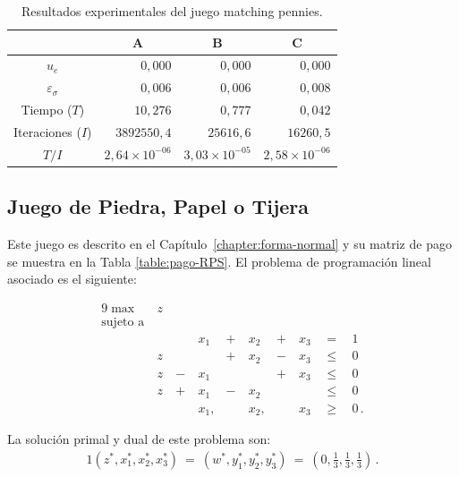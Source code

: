 \begin{table}[h]
\caption{Resultados experimentales del juego matching pennies.}
\label{table:resultados-rm-matching-pennies}
\centering
\begin{tabular}{c r r r}
    \toprule
    & \multicolumn{1}{c}{A} & \multicolumn{1}{c}{B} & \multicolumn{1}{c}{C} \\ \midrule
    $u_e$ & $0,000$ & $0,000$ & $0,000$ \\
    $\varepsilon_{\sigma}$ & $0,006$ & $0,006$ & $0,008$ \\
    Tiempo ($T$) & $10,276$ & $0,777$ & $0,042$ \\
    Iteraciones ($I$) & $3892550,4$ & $25616,6$ & $16260,5$ \\
    $T/I$ & $2,64 {\times} 10^{-06}$ & $3,03 {\times} 10^{-05}$ & $2,58 {\times} 10^{-06}$ \\
    \bottomrule
\end{tabular}
\end{table}


\subsection*{Juego de Piedra, Papel o Tijera}

Este juego es descrito en el Capítulo~\ref{chapter:forma-normal} y su matriz de pago se muestra en la Tabla \ref{table:pago-RPS}. El problema de programación lineal asociado es el siguiente:
\begin{samepage}
\begin{alignat}{9}
\max\  & z\ &  & & & & & \\ \nonumber
\text{sujeto a}\ & & & & & & & \\  \nonumber 
&    &    & x_1\ & +\ & x_2\ & +\ & x_3\ & \ =\     & \ 1 \\ \nonumber
& z\ &    &      & +\ & x_2\ & -\ & x_3\ & \ \leq\  & \ 0 \\ \nonumber
& z\ & -\ & x_1\ &    &      & +\ & x_3\ & \ \leq\  & \ 0 \\ \nonumber
& z\ & +\ & x_1\ & -\ & x_2\ &    &      & \ \leq\  & \ 0 \\ \nonumber
&    &    & x_1, &    & x_2, &    & x_3\ & \ \geq\  & \ 0  \,.  \nonumber
\end{alignat}
\end{samepage}
La solución primal y dual de este problema son:
\begin{alignat}{1}
(z^*, x_1^*, x_2^*, x_3^*)\ =\ (w^*, y_1^*, y_2^*, y_3^*)\ =\  \left(0, \frac{1}{3}, \frac{1}{3}, \frac{1}{3}\right) \,.
\end{alignat}

